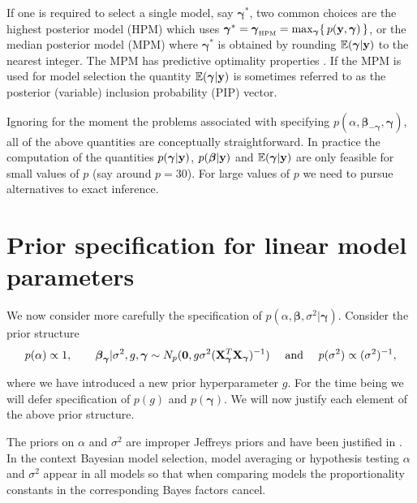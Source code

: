\documentclass[12pt]{article}
\def\vectorfontone{\bf}
\def\vectorfonttwo{\boldsymbol}
\def\vy{{\vectorfontone y}}                      %
\def\vzero{{\vectorfontone 0}}
\def\vbeta{{\vectorfonttwo \beta}}               %
\def\vgamma{{\vectorfonttwo \gamma}}             %
\def\matrixfontone{\bf}
\def\mX{{\matrixfontone X}}                      %
\def\bE{{\mathbb E}}                             %
\def\ds{\displaystyle}
\begin{document}
If one is required to select a single model, say $\vgamma^*$, two common choices are the 
highest posterior model (HPM) which uses $\vgamma^* = \vgamma_{\mbox{\tiny HPM}} = \max_\vgamma \{ \, p(\vy,\vgamma) \, \}$, or the
median posterior model (MPM) where $\vgamma^*$ is obtained by
rounding $\bE(\vgamma|\vy)$ to the nearest integer.
The MPM has predictive optimality properties \citep{barbieri2004}.
If the MPM is used for model selection
the quantity $\bE(\vgamma|\vy)$ is sometimes referred to as the
posterior (variable) inclusion probability (PIP) vector.

Ignoring for the moment the problems associated with specifying
$p(\alpha,\vbeta_{-\vgamma},\vgamma)$, all of the above quantities are conceptually
straightforward. In practice the computation of the quantities $p(\vgamma|\vy)$, $p(\vbeta|\vy)$ and 
$\bE(\vgamma|\vy)$ are only feasible for small values of $p$ (say around $p=30$). For large values of $p$ we need to pursue
alternatives to exact inference.

 
 
\section{Prior specification for linear model parameters}
\label{sec:model}

We now consider more carefully the specification of $p(\alpha,\vbeta,\sigma^2|\vgamma)$.
Consider the prior structure
\begin{equation}
\label{eq:priorStructure}
\begin{array}{c}
\ds p(\alpha) \propto 1,  
\qquad 
\vbeta_\vgamma | \sigma^2, g, \vgamma \sim N_p(\vzero, g \sigma^2 (\mX_\vgamma^T \mX_\vgamma)^{-1})
\quad \text{ and }  \quad 
\ds p(\sigma^2) \propto (\sigma^2)^{-1},                      
\end{array}
\end{equation} 

\noindent where we have introduced a new prior hyperparameter $g$.
For the time being we will defer specification of $p(g)$ and $p(\vgamma)$.
We will now justify each element of the above prior structure.

The priors on $\alpha$ and $\sigma^2$ are improper Jeffreys priors and have been justified 
in \cite{Berger1998}. In the context Bayesian model selection, model averaging or hypothesis 
testing $\alpha$ and $\sigma^2$ appear in all models 
so that when comparing models the proportionality constants in the corresponding
Bayes factors cancel.
\end{document}
